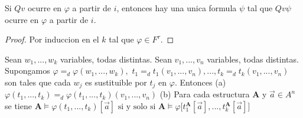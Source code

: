   \begin{lemma}
    Si \(Qv\) ocurre en \(\varphi \) a partir de \(i\), entonces hay una unica formula \(\psi \) tal que \(Qv\psi \) ocurre en \(\varphi \) a partir de \(i\).
  \end{lemma}
  \begin{proof}
    Por induccion en el \(k\) tal que \(\varphi \in F^{\tau }\).
  \end{proof}

  \begin{lemma}
    Sean \(w_{1},...,w_{k}\) variables, todas distintas. Sean \( v_{1},...,v_{n}\) variables, todas distintas. Supongamos \(\varphi =_{d}\varphi (w_{1},...,w_{k}),\) \( t_{1}=_{d}t_{1}(v_{1},...,v_{n}),...,t_{k}=_{d}t_{k}(v_{1},...,v_{n})\) son tales que cada \(w_{j}\) es sustituible por \(t_{j}\) en \(\varphi .\) Entonces
    (a) \(\varphi (t_{1},...,t_{k})=_{d}\varphi (t_{1},...,t_{k})(v_{1},...,v_{n})\)
    (b) Para cada estructura \(\mathbf{A}\) y \(\vec{a}\in A^{n}\) se tiene
    \(\displaystyle \mathbf{A}\models \varphi (t_{1},...,t_{k})[\vec{a}]\text{ si y solo si } \mathbf{A}\models \varphi \lbrack t_{1}^{\mathbf{A}}[\vec{a}],...,t_{k}^{ \mathbf{A}}[\vec{a}]] \)
  \end{lemma}
